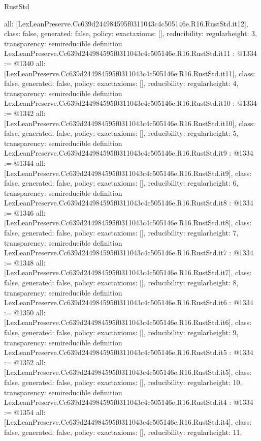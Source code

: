 \begin{lexlean}{RustStd}
\begin{coremodule}
{  all: [LexLeanPreserve.Cc639d244984595f0311043c4c505146e.R16.RustStd.it12],
  class: false,
  generated: false,
  policy: exact{axioms: []},
  reducibility: regular{height: 3},
  transparency: semireducible
}
definition LexLeanPreserve.Cc639d244984595f0311043c4c505146e.R16.RustStd.it11 : @1334 := @1340 {
  all: [LexLeanPreserve.Cc639d244984595f0311043c4c505146e.R16.RustStd.it11],
  class: false,
  generated: false,
  policy: exact{axioms: []},
  reducibility: regular{height: 4},
  transparency: semireducible
}
definition LexLeanPreserve.Cc639d244984595f0311043c4c505146e.R16.RustStd.it10 : @1334 := @1342 {
  all: [LexLeanPreserve.Cc639d244984595f0311043c4c505146e.R16.RustStd.it10],
  class: false,
  generated: false,
  policy: exact{axioms: []},
  reducibility: regular{height: 5},
  transparency: semireducible
}
definition LexLeanPreserve.Cc639d244984595f0311043c4c505146e.R16.RustStd.it9 : @1334 := @1344 {
  all: [LexLeanPreserve.Cc639d244984595f0311043c4c505146e.R16.RustStd.it9],
  class: false,
  generated: false,
  policy: exact{axioms: []},
  reducibility: regular{height: 6},
  transparency: semireducible
}
definition LexLeanPreserve.Cc639d244984595f0311043c4c505146e.R16.RustStd.it8 : @1334 := @1346 {
  all: [LexLeanPreserve.Cc639d244984595f0311043c4c505146e.R16.RustStd.it8],
  class: false,
  generated: false,
  policy: exact{axioms: []},
  reducibility: regular{height: 7},
  transparency: semireducible
}
definition LexLeanPreserve.Cc639d244984595f0311043c4c505146e.R16.RustStd.it7 : @1334 := @1348 {
  all: [LexLeanPreserve.Cc639d244984595f0311043c4c505146e.R16.RustStd.it7],
  class: false,
  generated: false,
  policy: exact{axioms: []},
  reducibility: regular{height: 8},
  transparency: semireducible
}
definition LexLeanPreserve.Cc639d244984595f0311043c4c505146e.R16.RustStd.it6 : @1334 := @1350 {
  all: [LexLeanPreserve.Cc639d244984595f0311043c4c505146e.R16.RustStd.it6],
  class: false,
  generated: false,
  policy: exact{axioms: []},
  reducibility: regular{height: 9},
  transparency: semireducible
}
definition LexLeanPreserve.Cc639d244984595f0311043c4c505146e.R16.RustStd.it5 : @1334 := @1352 {
  all: [LexLeanPreserve.Cc639d244984595f0311043c4c505146e.R16.RustStd.it5],
  class: false,
  generated: false,
  policy: exact{axioms: []},
  reducibility: regular{height: 10},
  transparency: semireducible
}
definition LexLeanPreserve.Cc639d244984595f0311043c4c505146e.R16.RustStd.it4 : @1334 := @1354 {
  all: [LexLeanPreserve.Cc639d244984595f0311043c4c505146e.R16.RustStd.it4],
  class: false,
  generated: false,
  policy: exact{axioms: []},
  reducibility: regular{height: 11},
}
\end{coremodule}
\end{lexlean}
